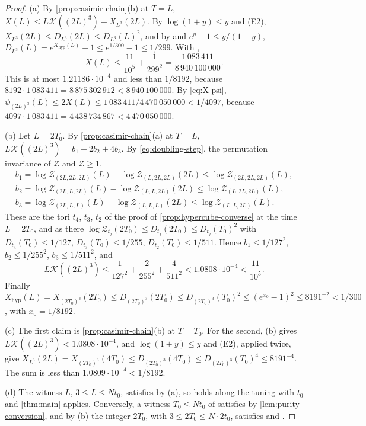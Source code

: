 \documentclass[11pt,a4paper]{amsart}
\theoremstyle{definition}
\theoremstyle{remark}
\numberwithin{equation}{section}
\newcommand{\TT}{\mathbb{T}}               %
\newcommand{\Zc}{\mathcal{Z}}              %
\newcommand{\Zs}[2]{\Zc_{#1}(#2)}          %
\newcommand{\XT}[2]{X_{#1}(#2)}            %
\newcommand{\Dexc}[2]{D_{#1}(#2)}          %
\newcommand{\psiT}[2]{\psi_{#1}(#2)}       %
\newcommand{\cube}[1]{(2#1)^3}             %
\newcommand{\dconst}{\frac{1}{4097}}       %
\newcommand{\xconst}{\frac{1}{8192}}       %
\newcommand{\dconstinl}{1/4097}            %
\newcommand{\xconstinl}{1/8192}            %
\newcommand{\Mcirc}{\text{\upshape(M$^{\circ}$)}}   %
\newcommand{\Bcirc}{\text{\upshape(B$^{\circ}$)}}   %
\newcommand{\Kone}{\text{\upshape(K1)}}             %
\newcommand{\Ktwo}{\text{\upshape(K2)}}             %
\newcommand{\tzero}{t_0}                   %
\begin{document}
\begin{proof}
(a) By \cref{prop:casimir-chain}(b) at $T=L$, $X(L)\le L\mathcal K(\cube{L})+\XT{L^3}{2L}$. By $\log(1+y)\le y$ and (E2), $\XT{L^3}{2L}\le\Dexc{L^3}{2L}\le\Dexc{L^3}{L}^2$, and by \Ktwo{} and $e^y-1\le y/(1-y)$, $\Dexc{L^3}{L}=e^{X_{\mathrm{hyp}}(L)}-1\le e^{1/300}-1\le1/299$. With \Kone,
\[
X(L)\le\frac{11}{10^5}+\frac1{299^2}=\frac{1\,083\,411}{8\,940\,100\,000}.
\]
This is at most $1.21186\cdot10^{-4}$ and less than $\xconstinl$, because $8192\cdot1\,083\,411=8\,875\,302\,912<8\,940\,100\,000$. By \eqref{eq:X-psi}, $\psiT{\cube{L}}{L}\le2X(L)\le1\,083\,411/4\,470\,050\,000<\dconstinl$, because $4097\cdot1\,083\,411=4\,438\,734\,867<4\,470\,050\,000$.

(b) Let $L=2T_0$. By \cref{prop:casimir-chain}(a) at $T=L$, $L\mathcal K(\cube{L})=b_1+2b_2+4b_3$. By \eqref{eq:doubling-step}, the permutation invariance of $\Zc$ and $\Zc\ge1$,
\begin{gather*}
b_1=\log\Zs{(2L,2L,2L)}{L}-\log\Zs{(L,2L,2L)}{2L}\le\log\Zs{(2L,2L,2L)}{L},\\
b_2=\log\Zs{(2L,L,2L)}{L}-\log\Zs{(L,L,2L)}{2L}\le\log\Zs{(L,2L,2L)}{L},\\
b_3=\log\Zs{(2L,L,L)}{L}-\log\Zs{(L,L,L)}{2L}\le\log\Zs{(L,L,2L)}{L}.
\end{gather*}
These are the tori $t_4$, $t_3$, $t_2$ of the proof of \cref{prop:hypercube-converse} at the time $L=2T_0$, and as there $\log\Zs{t_j}{2T_0}\le\Dexc{t_j}{2T_0}\le\Dexc{t_j}{T_0}^2$ with $\Dexc{t_4}{T_0}\le1/127$, $\Dexc{t_3}{T_0}\le1/255$, $\Dexc{t_2}{T_0}\le1/511$. Hence $b_1\le1/127^2$, $b_2\le1/255^2$, $b_3\le1/511^2$, and
\[
L\mathcal K(\cube{L})\le\frac1{127^2}+\frac2{255^2}+\frac4{511^2}<1.0808\cdot10^{-4}<\frac{11}{10^5}.
\]
Finally $X_{\mathrm{hyp}}(L)=\XT{\cube{T_0}}{2T_0}\le\Dexc{\cube{T_0}}{2T_0}\le\Dexc{\cube{T_0}}{T_0}^2\le(e^{x_0}-1)^2\le8191^{-2}<1/300$, with $x_0=\xconstinl$.

(c) The first claim is \cref{prop:casimir-chain}(b) at $T=T_0$. For the second, (b) gives $L\mathcal K(\cube{L})<1.0808\cdot10^{-4}$, and $\log(1+y)\le y$ and (E2), applied twice, give $\XT{L^3}{2L}=\XT{\cube{T_0}}{4T_0}\le\Dexc{\cube{T_0}}{4T_0}\le\Dexc{\cube{T_0}}{T_0}^4\le8191^{-4}$. The sum is less than $1.0809\cdot10^{-4}<\xconstinl$.

(d) The witness $L$, $3\le L\le N\tzero$, satisfies \Mcirc{} by (a), so \Mcirc{} holds along the tuning with $\tzero$ and \cref{thm:main} applies. Conversely, a witness $T_0\le N\tzero$ of \Mcirc{} satisfies \Bcirc{} by \cref{lem:purity-conversion}, and by (b) the integer $2T_0$, with $3\le2T_0\le N\cdot2\tzero$, satisfies \Kone{} and \Ktwo.
\end{proof}
\end{document}
